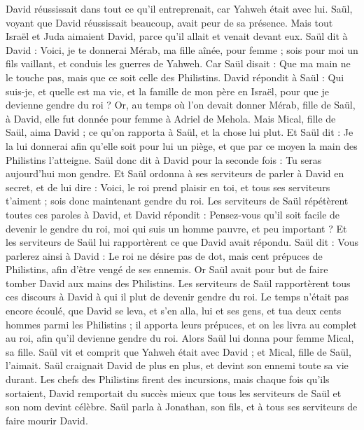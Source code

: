 \begin{multicols}{2}
David réussissait dans tout ce qu'il entreprenait, car Yahweh était avec lui.
Saül, voyant que David réussissait beaucoup, avait peur de sa présence.
Mais tout Israël et Juda aimaient David, parce qu'il allait et venait devant eux.
Saül dit à David : Voici, je te donnerai Mérab, ma fille aînée, pour femme ; sois pour moi un fils vaillant, et conduis les guerres de Yahweh. Car Saül disait : Que ma main ne le touche pas, mais que ce soit celle des Philistins.
David répondit à Saül : Qui suis-je, et quelle est ma vie, et la famille de mon père en Israël, pour que je devienne gendre du roi ?
Or, au temps où l’on devait donner Mérab, fille de Saül, à David, elle fut donnée pour femme à Adriel de Mehola.
Mais Mical, fille de Saül, aima David ; ce qu'on rapporta à Saül, et la chose lui plut.
Et Saül dit : Je la lui donnerai afin qu'elle soit pour lui un piège, et que par ce moyen la main des Philistins l’atteigne. Saül donc dit à David pour la seconde fois : Tu seras aujourd'hui mon gendre.
Et Saül ordonna à ses serviteurs de parler à David en secret, et de lui dire : Voici, le roi prend plaisir en toi, et tous ses serviteurs t'aiment ; sois donc maintenant gendre du roi.
Les serviteurs de Saül répétèrent toutes ces paroles à David, et David répondit : Pensez-vous qu’il soit facile de devenir le gendre du roi, moi qui suis un homme pauvre, et peu important ?
Et les serviteurs de Saül lui rapportèrent ce que David avait répondu.
Saül dit : Vous parlerez ainsi à David : Le roi ne désire pas de dot, mais cent prépuces de Philistins, afin d’être vengé de ses ennemis. Or Saül avait pour but de faire tomber David aux mains des Philistins.
Les serviteurs de Saül rapportèrent tous ces discours à David à qui il plut de devenir gendre du roi. Le temps n’était pas encore écoulé,
que David se leva, et s'en alla, lui et ses gens, et tua deux cents hommes parmi les Philistins ; il apporta leurs prépuces, et on les livra au complet au roi, afin qu'il devienne gendre du roi. Alors Saül lui donna pour femme Mical, sa fille.
Saül vit et comprit que Yahweh était avec David ; et Mical, fille de Saül, l'aimait.
Saül craignait David de plus en plus, et devint son ennemi toute sa vie durant.
Les chefs des Philistins firent des incursions, mais chaque fois qu’ils sortaient, David remportait du succès mieux que tous les serviteurs de Saül et son nom devint célèbre.
\VerseOne{}Saül parla à Jonathan, son fils, et à tous ses serviteurs de faire mourir David.

\end{multicols}
